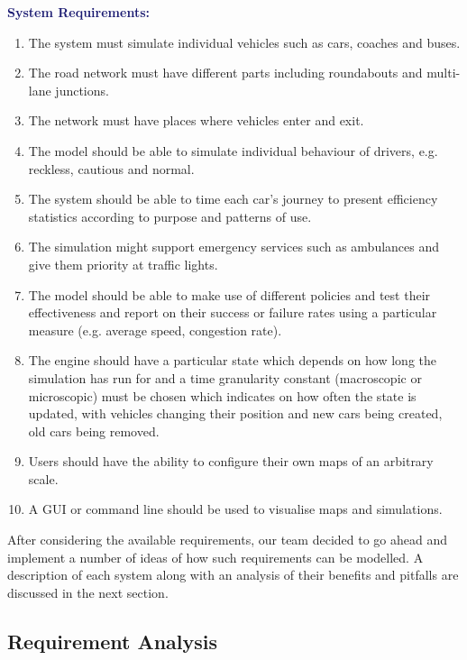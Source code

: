 \documentclass{article}
\begin{document}
	{\bf\textcolor{MidnightBlue}{System Requirements:}}
	\begin{enumerate}
		
		\item The system must simulate individual vehicles such as cars, coaches and buses.
		\item The road network must have different parts including roundabouts and multi-lane junctions. 
		\item The network must have places where vehicles enter and exit.
		\item The model should be able to simulate individual behaviour of drivers, e.g. reckless, cautious and normal. 
		\item The system should be able to time each car's journey to present efficiency statistics according to purpose and patterns of use. 
		\item The simulation might support emergency services such as ambulances and give them priority at traffic lights.
		\item The model should be able to make use of different policies and test their effectiveness and report on their success or failure rates using a particular measure (e.g. average speed, congestion rate).
		\item The engine should have a particular state which depends on how long the simulation has run for and a time granularity constant (macroscopic or microscopic) must be chosen which indicates on how often the state is updated, with vehicles changing their position and new cars being created, old cars being removed.  
		\item Users should have the ability to configure their own maps of an arbitrary scale. 
		\item A GUI or command line should be used to visualise maps and simulations.
	\end{enumerate}
	
	\noindent
	After considering the available requirements, our team decided to go ahead and implement a number of ideas of how such requirements can be modelled. A description of each system along with an analysis of their benefits and pitfalls are discussed in the next section. 
	
	
	\subsection{Requirement Analysis}
	
\end{document}
